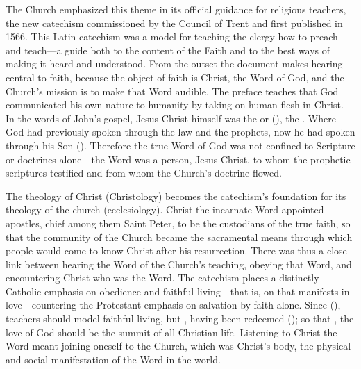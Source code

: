 The Church emphasized this theme in its official guidance for religious
teachers, the new catechism  commissioned by the
Council of Trent and first published in 1566.%
    \Autocites
    {Catholic:Catechismus1614}
    []{NewCatholic}
This Latin catechism was a model for teaching the clergy how to preach and
teach---a guide both to the content of the Faith and to the best ways of making
it heard and understood.%
    \Autocite[]{NewCatholic}
From the outset the document makes hearing central to faith, because the object
of faith is Christ, the Word of God, and the Church's mission is to make that
Word audible.
The preface teaches that God communicated his own nature to humanity by taking
on human flesh in Christ.
In the words of John's gospel, Jesus Christ himself was the  or
 (), the .
Where God had previously spoken through the law and the prophets, now he had
spoken through his Son ().
Therefore the true Word of God was not confined to Scripture or doctrines
alone---the Word was a person, Jesus Christ, to whom the prophetic scriptures
testified and from whom the Church's doctrine flowed.%
    \Autocite[9]{Catholic:Catechismus1614}


The theology of Christ (Christology) becomes the catechism's foundation for its
theology of the church (ecclesiology).
Christ the incarnate Word appointed apostles, chief among them Saint Peter, to
be the custodians of the true faith, so that the community of the Church became 
the sacramental means through which people would come to know Christ after his
resurrection.
There was thus a close link between hearing the Word of the Church's teaching,
obeying that Word, and encountering Christ who was the Word.
The catechism places a distinctly Catholic emphasis on obedience and faithful
living---that is, on  that manifests in love---countering
the Protestant emphasis on salvation by faith alone.
Since 
(), teachers should model faithful living,  but , having been redeemed 
(); so that , the love of God should be the summit of all Christian
life.%
    \Autocite[6--7]{Catholic:Catechismus1614}
Listening to Christ the Word meant joining oneself to the Church, which was
Christ's body, the physical and social manifestation of the Word in the world.


